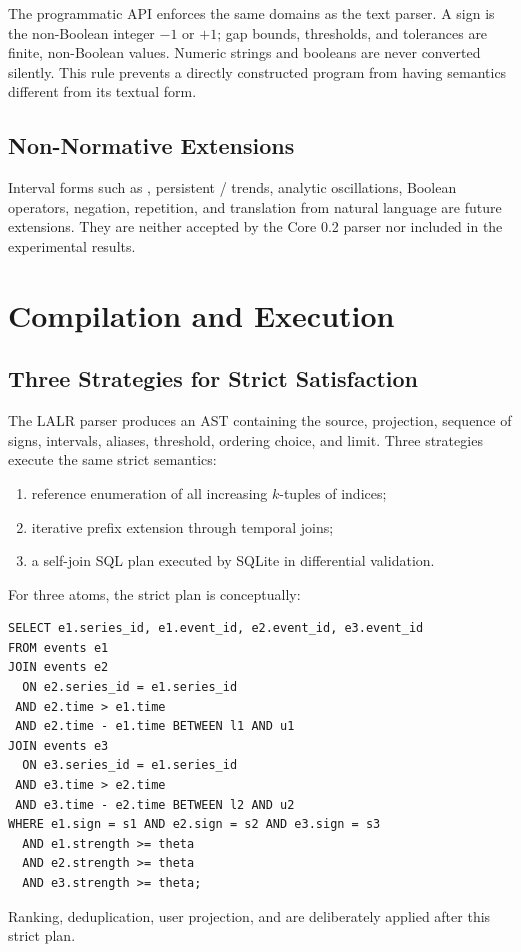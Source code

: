 The programmatic API enforces the same domains as the text parser. A sign is the non-Boolean integer $-1$ or $+1$; gap bounds, thresholds, and tolerances are finite, non-Boolean  values. Numeric strings and booleans are never converted silently. This rule prevents a directly constructed program from having semantics different from its textual form.

\subsection{Non-Normative Extensions}

Interval forms such as , persistent / trends, analytic oscillations, Boolean operators, negation, repetition, and translation from natural language are future extensions. They are neither accepted by the Core 0.2 parser nor included in the experimental results.

\section{Compilation and Execution}

\subsection{Three Strategies for Strict Satisfaction}

The LALR parser produces an AST containing the source, projection, sequence of signs, intervals, aliases, threshold, ordering choice, and limit. Three strategies execute the same strict semantics:
\begin{enumerate}
  \item reference enumeration of all increasing $k$-tuples of indices;
  \item iterative prefix extension through temporal joins;
  \item a self-join SQL plan executed by SQLite in differential validation.
\end{enumerate}

For three atoms, the strict plan is conceptually:
\begin{lstlisting}
SELECT e1.series_id, e1.event_id, e2.event_id, e3.event_id
FROM events e1
JOIN events e2
  ON e2.series_id = e1.series_id
 AND e2.time > e1.time
 AND e2.time - e1.time BETWEEN l1 AND u1
JOIN events e3
  ON e3.series_id = e1.series_id
 AND e3.time > e2.time
 AND e3.time - e2.time BETWEEN l2 AND u2
WHERE e1.sign = s1 AND e2.sign = s2 AND e3.sign = s3
  AND e1.strength >= theta
  AND e2.strength >= theta
  AND e3.strength >= theta;
\end{lstlisting}
Ranking, deduplication, user projection, and  are deliberately applied after this strict plan.

